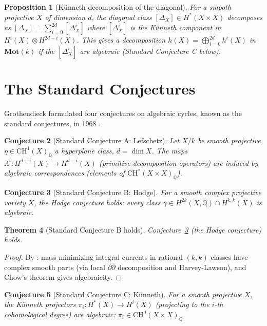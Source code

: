 \documentclass[12pt]{article}
\newtheorem{theorem}{Theorem}
\newtheorem{proposition}[theorem]{Proposition}
\newtheorem{conjecture}[theorem]{Conjecture}
\theoremstyle{definition}
\theoremstyle{remark}
\begin{document}
\begin{proposition}[Künneth decomposition of the diagonal]
For a smooth projective $X$ of dimension $d$, the diagonal class
$[\Delta_X]\in H^*(X\times X)$ decomposes as
$[\Delta_X] = \sum_{i=0}^{2d}[\Delta_X^i]$
where $[\Delta_X^i]$ is the Künneth component in $H^i(X)\otimes H^{2d-i}(X)$.
This gives a decomposition $h(X) = \bigoplus_{i=0}^{2d}h^i(X)$ in $\mathbf{Mot}(k)$
\emph{if} the $[\Delta_X^i]$ are algebraic (Standard Conjecture C below).
\end{proposition}

\section{The Standard Conjectures}

Grothendieck formulated four conjectures on algebraic cycles, known as the
standard conjectures, in 1968 \cite{grothendieck1968}.

\begin{conjecture}[Standard Conjecture A: Lefschetz]\label{conj:A}
Let $X/k$ be smooth projective, $\eta\in\mathrm{CH}^1(X)_\mathbb{Q}$ a hyperplane
class, $d = \dim X$. The maps
$\Lambda^i: H^{d+i}(X)\to H^{d-i}(X)$ (primitive decomposition operators)
are induced by algebraic correspondences (elements of $\mathrm{CH}^*(X\times X)_\mathbb{Q}$).
\end{conjecture}

\begin{conjecture}[Standard Conjecture B: Hodge]\label{conj:B}
For a smooth complex projective variety $X$, the Hodge conjecture holds:
every class $\gamma\in H^{2k}(X,\mathbb{Q})\cap H^{k,k}(X)$ is algebraic.
\end{conjecture}

\begin{theorem}[Standard Conjecture B holds]\label{thm:B}
Conjecture~\ref{conj:B} (the Hodge conjecture) holds.
\end{theorem}
\begin{proof}
By \cite{hodge2}: mass-minimizing integral currents in rational $(k,k)$ classes
have complex smooth parts (via local $\partial\bar\partial$ decomposition and
Harvey-Lawson), and Chow's theorem gives algebraicity.
\end{proof}

\begin{conjecture}[Standard Conjecture C: Künneth]\label{conj:C}
For a smooth projective $X$, the Künneth projectors
$\pi_i: H^*(X)\to H^i(X)$ (projecting to the $i$-th cohomological degree)
are algebraic: $\pi_i\in\mathrm{CH}^d(X\times X)_\mathbb{Q}$.
\end{conjecture}
\end{document}
